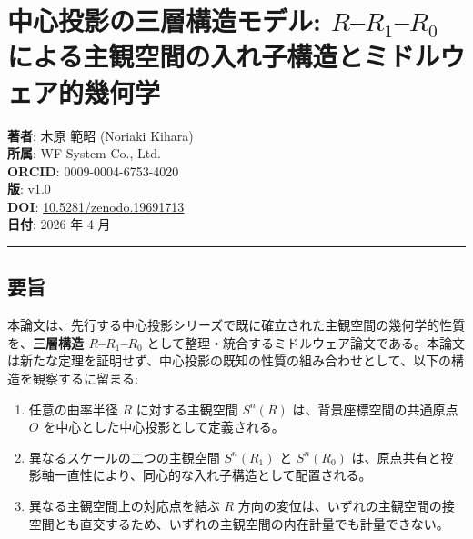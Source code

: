 \documentclass[
  a4paper,11pt]{ltjsarticle}
\author{}
\date{}
\providecommand{\tightlist}{%
  \setlength{\itemsep}{0pt}\setlength{\parskip}{0pt}}
\begin{document}
\section{\texorpdfstring{中心投影の三層構造モデル:
\(R\)--\(R_1\)--\(R_0\)
による主観空間の入れ子構造とミドルウェア的幾何学}{中心投影の三層構造モデル: R--R\_1--R\_0 による主観空間の入れ子構造とミドルウェア的幾何学}}\label{ux4e2dux5fc3ux6295ux5f71ux306eux4e09ux5c64ux69cbux9020ux30e2ux30c7ux30eb-rr_1r_0-ux306bux3088ux308bux4e3bux89b3ux7a7aux9593ux306eux5165ux308cux5b50ux69cbux9020ux3068ux30dfux30c9ux30ebux30a6ux30a7ux30a2ux7684ux5e7eux4f55ux5b66}

\textbf{著者}: 木原 範昭 (Noriaki Kihara)\\
\textbf{所属}: WF System Co., Ltd.\\
\textbf{ORCID}: 0009-0004-6753-4020\\
\textbf{版}: v1.0\\
\textbf{DOI}:
\href{https://doi.org/10.5281/zenodo.19691713}{10.5281/zenodo.19691713}\\
\textbf{日付}: 2026 年 4 月

\begin{center}\rule{0.5\linewidth}{0.5pt}\end{center}

\subsection{要旨}\label{ux8981ux65e8}

本論文は、先行する中心投影シリーズで既に確立された主観空間の幾何学的性質を、\textbf{三層構造
\(R\)--\(R_1\)--\(R_0\)}
として整理・統合するミドルウェア論文である。本論文は新たな定理を証明せず、中心投影の既知の性質の組み合わせとして、以下の構造を観察するに留まる:

\begin{enumerate}
\def\labelenumi{\arabic{enumi}.}
\tightlist
\item
  任意の曲率半径 \(R\) に対する主観空間 \(S^n(R)\)
  は、背景座標空間の共通原点 \(O\)
  を中心とした中心投影として定義される。
\item
  異なるスケールの二つの主観空間 \(S^n(R_1)\) と \(S^n(R_0)\)
  は、原点共有と投影軸一直性により、同心的な入れ子構造として配置される。
\item
  異なる主観空間上の対応点を結ぶ \(R\)
  方向の変位は、いずれの主観空間の接空間とも直交するため、いずれの主観空間の内在計量でも計量できない。
\end{enumerate}
\end{document}
